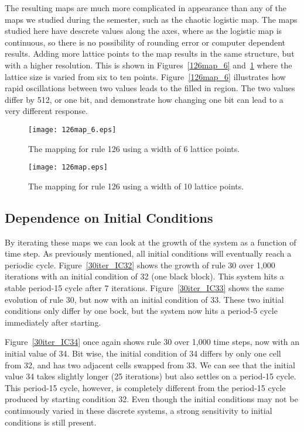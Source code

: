The resulting maps are much more complicated in appearance than any of the maps we studied during the semester, such as the chaotic logistic map.  
The maps studied here have descrete values along the axes, where as the logistic map is continuous, so there is no possibility of rounding error or computer dependent results.  
Adding more lattice points to the map results in the same structure, but with a higher resolution.  
This is shown in Figures~\ref{126map_6} and~\ref{126map} where the lattice size is varied from six to ten points.  
Figure~\ref{126map_6} illustrates how rapid oscillations between two values leads to the filled in region.  
The two values differ by 512, or one bit, and demonstrate how changing one bit can lead to a very different response.   

\begin{figure}
    \begin{minipage}[b]{0.49\textwidth}
        \centering
        \texttt{[image: 126map\_6.eps]}
        \caption{\label{126map_6} The mapping for rule 126 using a width of 6 lattice points.  }
    \end{minipage}
    \hspace{0.5cm}
    \begin{minipage}[b]{0.49\textwidth}
        \centering
        \texttt{[image: 126map.eps]}
        \caption{\label{126map} The mapping for rule 126 using a width of 10 lattice points.}
    \end{minipage}
\end{figure}

\subsection{Dependence on Initial Conditions}

By iterating these maps we can look at the growth of the system as a function of time step.  As previously mentioned, all initial conditions will eventually reach a periodic cycle.  Figure~\ref{30iter_IC32} shows the growth of rule 30 over 1,000 iterations with an initial condition of 32 (one black block).  This system hits a stable period-15 cycle after 7 iterations.  Figure~\ref{30iter_IC33} shows the same evolution of rule 30, but now with an initial condition of 33.  These two initial conditions only differ by one bock, but the system now hits a period-5 cycle immediately after starting.  

Figure~\ref{30iter_IC34} once again shows rule 30 over 1,000 time steps, now with an initial value of 34.  Bit wise, the initial condition of 34 differs by only one cell from 32, and has two adjacent cells swapped from 33.  We can see that the initial value 34 takes slightly longer (25 iterations) but also settles on a period-15 cycle.  This period-15 cycle, however, is completely different from the period-15 cycle produced by starting condition 32.  Even though the initial conditions may not be continuously varied in these discrete systems, a strong sensitivity to initial conditions is still present.  

